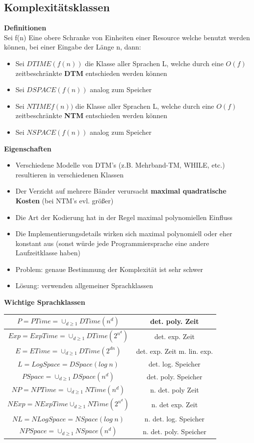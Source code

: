 \documentclass[12pt,a4paper]{article}
\begin{document}
\subsection{Komplexitätsklassen}
\textbf{Definitionen}\\
Sei f(n) Eine obere Schranke von Einheiten einer Resource welche benutzt werden können, bei einer Eingabe der Länge n, dann:\\
\begin{itemize}
\item Sei $DTIME(f(n))$ die Klasse aller Sprachen L, welche durch eine $O(f)$ zeitbeschränkte \textbf{DTM} entschieden werden können
\item Sei $DSPACE(f(n))$ analog zum Speicher
\item Sei $NTIMEf(n))$ die Klasse aller Sprachen L, welche durch eine $O(f)$ zeitbeschränkte \textbf{NTM} entschieden werden können
\item Sei $NSPACE(f(n))$ analog zum Speicher
\end{itemize}
\textbf{Eigenschaften}
\begin{itemize}
\item Verschiedene Modelle von DTM's (z.B. Mehrband-TM, WHILE, etc.) resultieren in verschiedenen Klassen
\item Der Verzicht auf mehrere Bänder verursacht \textbf{maximal quadratische Kosten} (bei NTM's evl. größer)
\item Die Art der Kodierung hat in der Regel maximal polynomiellen Einfluss
\item Die Implementierungsdetails wirken sich maximal polynomiell oder eher konstant aus (sonst würde jede Programmiersprache eine andere Laufzeitklasse haben)
\item Problem: genaue Bestimmung der Komplexität ist sehr schwer
\item Lösung: verwenden allgemeiner Sprachklassen
\end{itemize}
\textbf{Wichtige Sprachklassen}\\
\begin{tabular}{|c|c|}
\hline
$P = PTime = \cup_{d\geq 1}DTime(n^d)$ & det. poly. Zeit \\
\hline
$Exp = ExpTime = \cup_{d\geq 1}DTime(2^{n^d})$ & det. exp. Zeit \\
\hline
$E = ETime = \cup_{d\geq 1}DTime(2^{dn})$ & det. exp. Zeit m. lin. exp. \\
\hline
$L = LogSpace = DSpace(log\hspace{3pt}n)$ & det. log. Speicher \\
\hline
$PSpace = \cup_{d\geq 1}DSpace(n^d)$ & det. poly. Speicher \\
\hline
$NP = NPTime = \cup_{d\geq 1} NTime(n^d)$ & n. det. poly Zeit \\
\hline
$NExp = NExpTime \cup_{d\geq 1} NTime(2^{n^d})$ & n. det exp. Zeit \\
\hline
$NL = NLogSpace = NSpace(log\hspace{3pt}n)$ & n. det. log. Speicher \\
\hline
$NPSpace = \cup_{d\geq 1} NSpace(n^d)$ & n. det. poly. Speicher \\
\hline
\end{tabular}
\end{document}
